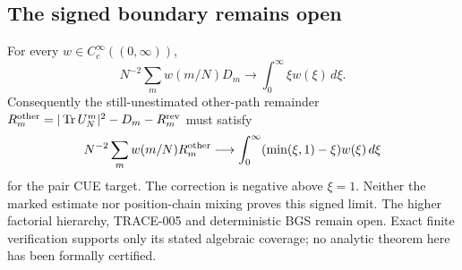 \subsection{The signed boundary remains open}
For every $w\in C_c^\infty((0,\infty))$,
\[
 N^{-2}\sum_m w(m/N)D_m\longrightarrow\int_0^\infty \xi w(\xi)\,d\xi.
\]
Consequently the still-unestimated other-path remainder
$R_m^{\rm other}=|\operatorname{Tr}U_N^m|^2-D_m-R_m^{\rm rev}$ must satisfy
\[
 N^{-2}\sum_m w(m/N)R_m^{\rm other}
 \longrightarrow\int_0^\infty(\min(\xi,1)-\xi)w(\xi)\,d\xi
\]
for the pair CUE target. The correction is negative above $\xi=1$.
Neither the marked estimate nor position-chain mixing proves this signed
limit. The higher factorial hierarchy, TRACE-005 and deterministic BGS
remain open. Exact finite verification supports only its stated algebraic
coverage; no analytic theorem here has been formally certified.
